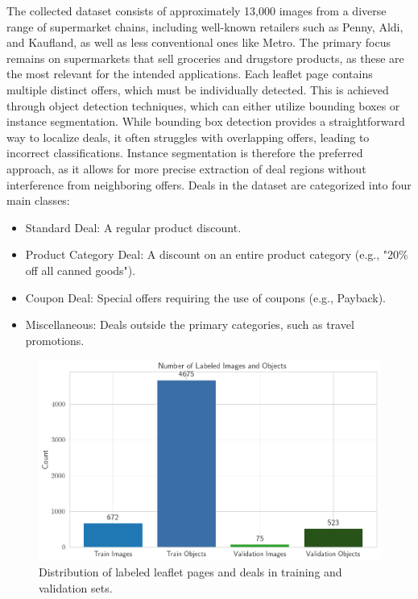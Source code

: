 \documentclass[11pt]{article}
\begin{document}
The collected dataset consists of approximately 13,000 images from a diverse range of supermarket chains, including well-known retailers such as Penny, Aldi, and Kaufland, as well as less conventional ones like Metro. The primary focus remains on supermarkets that sell groceries and drugstore products, as these are the most relevant for the intended applications. Each leaflet page contains multiple distinct offers, which must be individually detected. This is achieved through object detection techniques, which can either utilize bounding boxes or instance segmentation. While bounding box detection provides a straightforward way to localize deals, it often struggles with overlapping offers, leading to incorrect classifications. Instance segmentation is therefore the preferred approach, as it allows for more precise extraction of deal regions without interference from neighboring offers. Deals in the dataset are categorized into four main classes:

\begin{itemize}
    \item Standard Deal: A regular product discount.
    \item Product Category Deal: A discount on an entire product category (e.g., "20\% off all canned goods").
    \item Coupon Deal: Special offers requiring the use of coupons (e.g., Payback).
    \item Miscellaneous: Deals outside the primary categories, such as travel promotions.
\end{itemize}

\begin{figure}[h!]
    \centering
    \includegraphics[width=0.7\linewidth]{figures/deal_detection/dataset_count.png}
    \caption{Distribution of labeled leaflet pages and deals in training and validation sets.}
    \label{fig:ddetect_dataset_count}
\end{figure}
\end{document}

